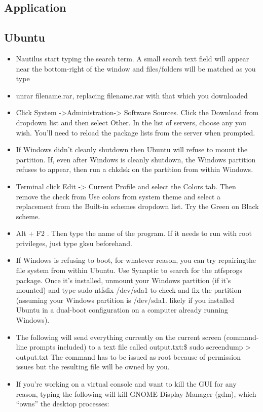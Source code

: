 \documentclass[a4paper,12pt,twoside]{book}
\begin{document}
\begin{CJK*}{UTF8}{song}
\chapter{Application}
\section{Ubuntu}
		\begin{itemize}
		\item Nautilus start typing the search term. A small search text field will appear near the bottom-right of the window and files/folders will be matched as you type
		\item unrar  filename.rar, replacing filename.rar with that which you downloaded
		\item Click System ->Administration-> Software Sources. Click the Download from dropdown list and then select Other. In the list of servers, choose any you wish. You'll need to reload the package lists from the server when prompted.
		\item If Windows didn't cleanly shutdown then Ubuntu will refuse to mount the partition. If, even after Windows is cleanly shutdown, the Windows partition refuses to appear, then run a chkdsk on the partition from within Windows.
		\item Terminal click Edit -> Current Profile and select the Colors tab. Then remove the check from Use colors from system theme and select a replacement from the Built-in schemes dropdown list. Try the Green on Black scheme.
		\item Alt + F2 . Then type the name of the program. If it needs to run with root privileges, just type gksu beforehand.
		\item If Windows is refusing to boot, for whatever reason, you can try repairingthe file system from within Ubuntu. Use Synaptic to search for the ntfsprogs package. Once it's installed, unmount your Windows partition (if it's mounted) and
		type sudo ntfsfix /dev/sda1 to check and fix the partition (assuming your Windows partition is /dev/sda1. likely if you installed Ubuntu in a dual-boot configuration on a computer already running Windows).
		\item The following will send everything currently on the current screen (command-line prompts included) to a text file called output.txt:\$ sudo screendump > output.txt
		The command has to be issued as root because of permission issues but the resulting file will be owned by you.
		\item 	If you're working on a virtual console and want to kill the GUI for any reason, typing the following will kill GNOME Display Manager (gdm), which ``owns'' the desktop processes:

\end{itemize}
\end{CJK*}
\end{document}
